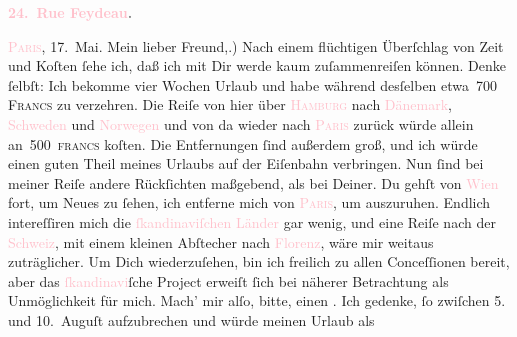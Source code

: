            \pstart
           \begin{otherlanguage}{french}\textcolor{gray}{\textbf{\textbf{\textcolor{pink}{24. Rue Feydeau}{}\ledrightnote{\textcolor{pink}{rue Feydeau}}.}}}\end{otherlanguage}\hfill \textsc{\textcolor{pink}{Paris}{}\ledrightnote{\textcolor{pink}{Paris}}}, 17. Mai.\pend
           \pstart\center{}Mein lieber Freund,\pend{}.) Nach einem flüchtigen Überſchlag von Zeit und Koſten ſehe ich, daß ich mit Dir
               werde kaum zuſammenreiſen können. Denke ſelbſt: Ich bekomme vier Wochen Urlaub und
               habe während desſelben etwa 700 \textsc{Francs} zu verzehren. Die
               Reiſe von hier über \textsc{\textcolor{pink}{Hamburg}{}\ledrightnote{\textcolor{pink}{Hamburg}}} nach \textcolor{pink}{Dänemark}{}\ledrightnote{\textcolor{pink}{Dänemark}}, \textcolor{pink}{Schweden}{}\ledrightnote{\textcolor{pink}{Schweden}} und \textcolor{pink}{Norwegen}{}\ledrightnote{\textcolor{pink}{Norwegen}}{ }\strikeout{\textcolor{gray}{würde}} und von da wieder nach \textsc{\textcolor{pink}{Paris}{}\ledrightnote{\textcolor{pink}{Paris}}} zurück würde allein an 500 \textsc{francs} koſten. Die
               Entfernungen {\pb}ſind außerdem groß, und ich würde
               einen guten Theil meines Urlaubs auf der Eiſenbahn verbringen. Nun ſind bei meiner
               Reiſe andere Rückſichten maßgebend, als bei Deiner. Du gehſt von \textcolor{pink}{Wien}{}\ledrightnote{\textcolor{pink}{Wien}} fort, um Neues zu ſehen, ich entferne mich von \textsc{\textcolor{pink}{Paris}{}\ledrightnote{\textcolor{pink}{Paris}}}, um auszuruhen. Endlich intereſſiren mich die \textcolor{pink}{ſkandinaviſchen Länder}{} gar wenig, und eine Reiſe nach der \textcolor{pink}{Schweiz}{}\ledrightnote{\textcolor{pink}{Schweiz}}, mit einem kleinen Abſtecher nach \textcolor{pink}{Florenz}{}\ledrightnote{\textcolor{pink}{Florenz}}, wäre mir weitaus zuträglicher. Um Dich wiederzuſehen,
               bin ich freilich zu allen Conceſſionen {\pb}bereit, aber
               das \textcolor{pink}{ſkandinavi}{}ſche Project erweiſt ſich bei näherer Betrachtung als
               Unmöglichkeit für mich. Mach’ mir alſo, bitte, einen \label{K_L02774-1v}\label{K_L02774-1h}. Ich gedenke, ſo zwiſchen 5. und 10. Auguſt aufzubrechen und würde meinen Urlaub als
